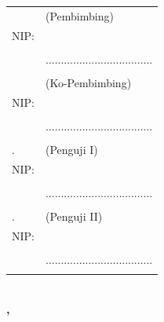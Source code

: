 \noindent
\begin{tabularx}{\textwidth}{X l}
  \advisor{}               & (Pembimbing)                      \\
  NIP: \advisornip{}       &                                     \\
                           &  \\
                           & ...................................                                    \\
                           &                                     \\
  \coadvisor{}             & (Ko-Pembimbing)                     \\
  NIP: \coadvisornip{}     &                                     \\
                           &  \\
                           & ...................................                                    \\
                           &                                     \\
  \examinerone{}.          & (Penguji I)                         \\
  NIP: \examineronenip{}   &                                     \\
                           &  \\
                           & ...................................                                    \\
                           &                                     \\
  \examinertwo{}.          & (Penguji II)                        \\
  NIP: \examinertwonip{}   &                                     \\
                           &  \\
                           & ................................... \\                                   \\
\end{tabularx}
\endgroup



\begin{center}
  \textbf{\MakeUppercase{\place{}}\\\MONTH{}, \the\year{}}
\end{center}
\endgroup
